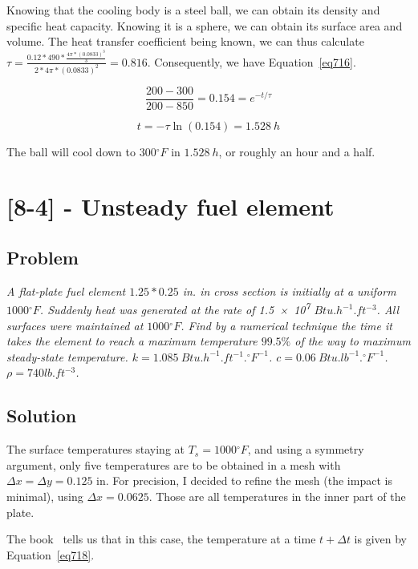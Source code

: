 Knowing that the cooling body is a steel ball, we can obtain its density and specific heat capacity. Knowing it is a sphere, we can obtain its surface area and volume. The heat transfer coefficient being known, we can thus calculate $\tau = \frac{0.12 * 490 * \frac{4\pi * (0.0833)^3}{3}}{2 * 4\pi * (0.0833)^2} = 0.816$. Consequently, we have Equation~\ref{eq716}.

\begin{equation}\label{eq716}
\frac{200 - 300}{200 - 850} = 0.154 = e^{-t/\tau}
\end{equation}

\begin{equation}\label{eq717}
t = -\tau \ln (0.154) = 1.528\ h
\end{equation}

The ball will cool down to $300{}^\circ F$ in $1.528\ h$, or roughly an hour and a half.

\section{[8-4] - Unsteady fuel element}
\label{prob74}

\subsection{Problem}
\textit{A flat-plate fuel element $1.25 * 0.25$ in. in cross section is initially at a uniform $1000{}^\circ F$. Suddenly heat was generated at the rate of \num{1.5e7} $Btu.h^{-1}.ft^{-3}$. All surfaces were maintained at $1000{}^\circ F$. Find by a numerical technique the time it takes the element to reach a maximum temperature $99.5\%$ of the way to maximum steady-state temperature. $k=1.085\ Btu.h^{-1}.ft^{-1}.{}^\circ F^{-1}$. $c = 0.06\ Btu.lb^{-1}.{}^\circ F^{-1}$. $\rho = 740 lb.ft^{-3}$.}

\subsection{Solution}

The surface temperatures staying at $T_s = 1000{}^\circ F$, and using a symmetry argument, only five temperatures are to be obtained in a mesh with $\Delta x = \Delta y = 0.125$ in. For precision, I decided to refine the mesh (the impact is minimal), using $\Delta x = 0.0625$. Those are all temperatures in the inner part of the plate.

The book~\cite{book01} tells us that in this case, the temperature at a time $t+\Delta t$ is given by Equation~\ref{eq718}.

